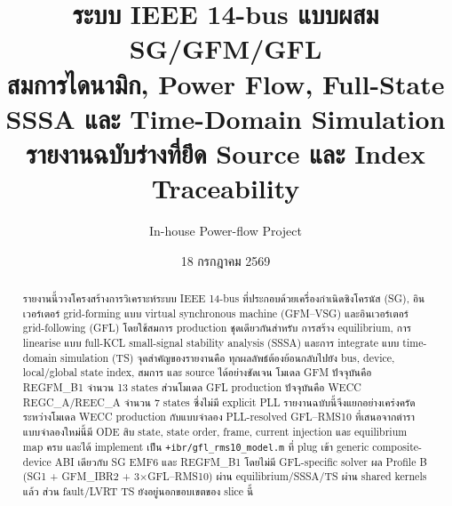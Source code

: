 \documentclass[12pt,a4paper]{article}
\title{\textbf{ระบบ IEEE 14-bus แบบผสม SG/GFM/GFL}\\
\large สมการไดนามิก, Power Flow, Full-State SSSA และ Time-Domain Simulation\\[2mm]
\normalsize รายงานฉบับร่างที่ยึด Source และ Index Traceability}
\author{In-house Power-flow Project}
\date{18 กรกฎาคม 2569}
\begin{document}
\maketitle

\begin{center}
\end{center}

\begin{abstract}
รายงานนี้วางโครงสร้างการวิเคราะห์ระบบ IEEE 14-bus ที่ประกอบด้วยเครื่องกำเนิดซิงโครนัส
(SG), อินเวอร์เตอร์ grid-forming แบบ virtual synchronous machine (GFM--VSG)
และอินเวอร์เตอร์ grid-following (GFL) โดยใช้สมการ production ชุดเดียวกันสำหรับ
การสร้าง equilibrium, การ linearise แบบ full-KCL small-signal stability analysis
(SSSA) และการ integrate แบบ time-domain simulation (TS) จุดสำคัญของรายงานคือ
ทุกผลลัพธ์ต้องย้อนกลับไปยัง bus, device, local/global state index, สมการ และ source
ได้อย่างชัดเจน โมเดล GFM ปัจจุบันคือ REGFM\_B1 จำนวน 13 states ส่วนโมเดล GFL
production ปัจจุบันคือ WECC REGC\_A/REEC\_A จำนวน 7 states ซึ่งไม่มี explicit PLL
รายงานฉบับนี้จึงแยกอย่างเคร่งครัดระหว่างโมเดล WECC production กับแบบจำลอง
PLL-resolved GFL--RMS10 ที่เสนอจากตำรา แบบจำลองใหม่นี้มี ODE สิบ state, state order, frame,
current injection และ equilibrium map ครบ และได้ implement เป็น
\texttt{+ibr/gfl\_rms10\_model.m} ที่ plug เข้า generic composite-device ABI เดียวกับ
SG EMF6 และ REGFM\_B1 โดยไม่มี GFL-specific solver ผล Profile B (SG1 + GFM\_IBR2 +
3$\times$GFL--RMS10) ผ่าน equilibrium/SSSA/TS ผ่าน shared kernels แล้ว
ส่วน fault/LVRT TS ยังอยู่นอกขอบเขตของ slice นี้
\end{abstract}

\newpage
\tableofcontents
\newpage
\end{document}
